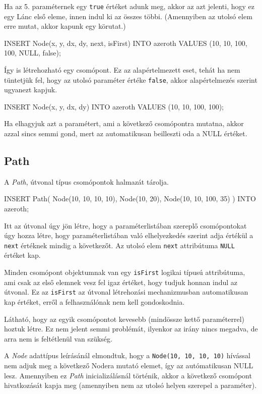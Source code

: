 Ha az 5. paraméternek egy \texttt{true} értéket adunk meg, akkor az azt jelenti, hogy ez egy Lánc első eleme, innen indul ki az összes többi. (Amennyiben az utolsó elem erre mutat, akkor kapunk egy körutat.)

\begin{sql}
INSERT Node(x, y, dx, dy, next, isFirst) INTO 
azeroth VALUES (10, 10, 100, 100, NULL, false);
\end{sql}

Így is létrehozható egy csomópont. Ez az alapértelmezett eset, tehát ha nem tüntetjük fel, hogy az utolsó paraméter értéke \texttt{false}, akkor alapértelmezés szerint ugyanezt kapjuk.


\begin{sql}
INSERT Node(x, y, dx, dy) INTO azeroth VALUES (10, 10, 100, 100);
\end{sql}
Ha elhagyjuk azt a paramétert, ami a következő csomópontra mutatna, akkor azzal sincs semmi gond, mert az automatikusan beilleszti oda a NULL értéket.

\subsection{Path}

A \textit{Path}, útvonal típus csomópontok halmazát tárolja.

\begin{sql}
INSERT Path(
    Node(10, 10, 10, 10),
    Node(10, 20),
    Node(10, 10, 100, 35)
) INTO azeroth;
\end{sql}

Itt az útvonal úgy jön létre, hogy a paraméterlistában szereplő csomópontokat úgy hozza létre, hogy paraméterlistában való elhelyezkedés szerint adja értékül a \texttt{next} értéknek mindig a következőt. Az utolsó elem \texttt{next} attribútuma \texttt{NULL} értéket kap.

Minden csomópont objektumnak van egy \texttt{isFirst} logikai típusú attribútuma, ami csak az első elemnek vesz fel igaz értéket, hogy tudjuk honnan indul az útvonal. Ez az \texttt{isFirst} az útvonal létrehozási mechanizmusban automatikusan kap értéket, erről a felhasználónak nem kell gondoskodnia.

Látható, hogy az egyik csomópontot kevesebb (mindössze kettő paraméterrel) hoztuk létre. Ez nem jelent semmi problémát, ilyenkor az irány nincs megadva, de arra nem is feltétlenül van szükség.

A \textit{Node} adattípus leírásánál elmondtuk, hogy a \texttt{Node(10, 10, 10, 10)} hívással nem adjuk meg a következő Nodera mutató elemet, így az autómatikusan NULL lesz. Amennyiben ez  \textit{Path} inicializálásnál történik, akkor a következő csomópont hivatkozását kapja meg (amennyiben nem az utolsó helyen szerepel a paraméter).

